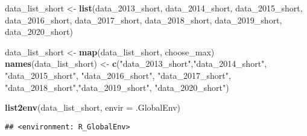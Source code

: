 \documentclass[
]{article}
\newenvironment{Shaded}{\begin{snugshade}}{\end{snugshade}}
\newcommand{\DataTypeTok}[1]{\textcolor[rgb]{0.13,0.29,0.53}{#1}}
\newcommand{\DecValTok}[1]{\textcolor[rgb]{0.00,0.00,0.81}{#1}}
\newcommand{\KeywordTok}[1]{\textcolor[rgb]{0.13,0.29,0.53}{\textbf{#1}}}
\newcommand{\NormalTok}[1]{#1}
\newcommand{\StringTok}[1]{\textcolor[rgb]{0.31,0.60,0.02}{#1}}
\begin{document}
\begin{Shaded}
\begin{Highlighting}[]
\NormalTok{data\_list\_short \textless{}{-}}\StringTok{ }\KeywordTok{list}\NormalTok{(data\_}\DecValTok{2013}\NormalTok{\_short, data\_}\DecValTok{2014}\NormalTok{\_short, data\_}\DecValTok{2015}\NormalTok{\_short, data\_}\DecValTok{2016}\NormalTok{\_short, data\_}\DecValTok{2017}\NormalTok{\_short, data\_}\DecValTok{2018}\NormalTok{\_short, data\_}\DecValTok{2019}\NormalTok{\_short, data\_}\DecValTok{2020}\NormalTok{\_short)}
\end{Highlighting}
\end{Shaded}

\begin{Shaded}
\begin{Highlighting}[]
\NormalTok{data\_list\_short \textless{}{-}}\StringTok{ }\KeywordTok{map}\NormalTok{(data\_list\_short, choose\_max) }
\KeywordTok{names}\NormalTok{(data\_list\_short) \textless{}{-}}\StringTok{ }\KeywordTok{c}\NormalTok{(}\StringTok{"data\_2013\_short"}\NormalTok{,}\StringTok{"data\_2014\_short"}\NormalTok{, }\StringTok{"data\_2015\_short"}\NormalTok{, }\StringTok{"data\_2016\_short"}\NormalTok{, }\StringTok{"data\_2017\_short"}\NormalTok{, }\StringTok{"data\_2018\_short"}\NormalTok{,}\StringTok{"data\_2019\_short"}\NormalTok{, }\StringTok{"data\_2020\_short"}\NormalTok{)}

\KeywordTok{list2env}\NormalTok{(data\_list\_short, }\DataTypeTok{envir =}\NormalTok{ .GlobalEnv)}
\end{Highlighting}
\end{Shaded}

\begin{verbatim}
## <environment: R_GlobalEnv>
\end{verbatim}
\end{document}
